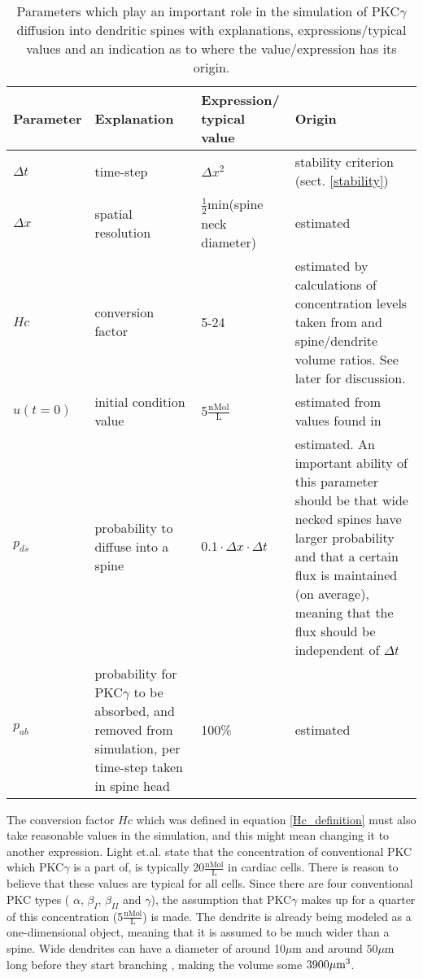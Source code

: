 \begin{table}[H]
\centering
\begin{tabular}{|p{}|p{}|p{}|p{}|}
\hline
\textbf{Parameter} & \textbf{Explanation} &\textbf{Expression/ typical value}& \textbf{Origin} \\
\hline
$\Delta t$ & time-step & $\Delta x^2$ & stability criterion (sect. \ref{stability}) \\
\hline
$\Delta x$ & spatial resolution & $\frac{1}{2}$min(spine neck diameter) & estimated \\
\hline
$Hc$ & conversion factor & 5-24 & estimated by calculations of concentration levels taken from \cite{light1996protein} and spine/dendrite volume ratios. See later for discussion. \\
\hline
$u(t=0)$ & initial condition value & 5$\frac{\text{nMol}}{\text{L}}$ & estimated from values found in \cite{light1996protein}\\
\hline
$p_{ds}$ & probability to diffuse into a spine & $0.1\cdot\Delta x\cdot\Delta t$& estimated. An important ability of this parameter should be that wide necked spines have larger probability and that a certain flux is maintained (on average), meaning that the flux should be independent of $\Delta t$ \\
\hline
$p_{ab}$ & probability for PKC$\gamma$ to be absorbed, and removed from simulation, per time-step taken in spine head & 100\% & estimated\\
\hline
\end{tabular}
\caption[Important parameters]{Parameters which play an important role in the simulation of PKC$\gamma$ diffusion into dendritic spines with explanations, expressions/typical values and an indication as to where the value/expression has its origin.}
\label{table:parameters}
\end{table}

The conversion factor $Hc$ which was defined in equation \eqref{Hc_definition} must also take reasonable values in the simulation, and this might mean changing it to another expression. 
Light et.al. \cite{light1996protein} state that the concentration of conventional PKC which PKC$\gamma$ is a part of, is typically 20$\frac{\text{nMol}}{\text{L}}$ in cardiac cells. 
There is reason to believe that these values are typical for all cells. 
Since there are four conventional PKC types ( $\alpha$, $\beta_{I}$, $\beta_{II}$ and $\gamma$), the assumption that PKC$\gamma$ makes up for a quarter of this concentration (5$\frac{\text{nMol}}{\text{L}}$) is made. 
The dendrite is already being modeled as a one-dimensional object, meaning that it is assumed to be much wider than a spine. 
Wide dendrites can have a diameter of around 10$\mu$m and around $50\mu$m long before they start branching \cite{wikipedia??}, making the volume some $3900\mu\text m^3$. 

